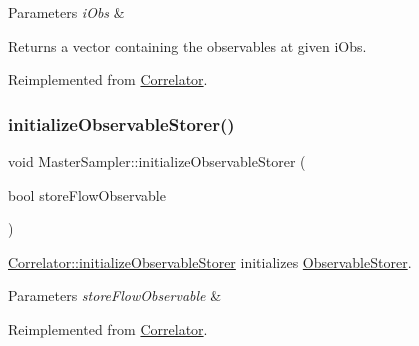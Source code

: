 \begin{DoxyParams}{Parameters}
{\em i\+Obs} & \\
\hline
\end{DoxyParams}
\begin{DoxyReturn}{Returns}
a vector containing the observables at given i\+Obs. 
\end{DoxyReturn}


Reimplemented from \mbox{\hyperlink{class_correlator_a7fb062b098beb078f3e546f4717b4941}{Correlator}}.

\mbox{\label{class_master_sampler_a88e2eec68ea6bd60cc3f375ac04a8ded}} 
\subsubsection{\texorpdfstring{initializeObservableStorer()}{initializeObservableStorer()}}
{\footnotesize\ttfamily void Master\+Sampler\+::initialize\+Observable\+Storer (\begin{DoxyParamCaption}\item[{bool}]{store\+Flow\+Observable }\end{DoxyParamCaption})\hspace{0.3cm}{\ttfamily [virtual]}}



\mbox{\hyperlink{class_correlator_ab99886c09dd27dfc8676d0032cecf9bc}{Correlator\+::initialize\+Observable\+Storer}} initializes \mbox{\hyperlink{class_observable_storer}{Observable\+Storer}}. 


\begin{DoxyParams}{Parameters}
{\em store\+Flow\+Observable} & \\
\hline
\end{DoxyParams}


Reimplemented from \mbox{\hyperlink{class_correlator_ab99886c09dd27dfc8676d0032cecf9bc}{Correlator}}.

